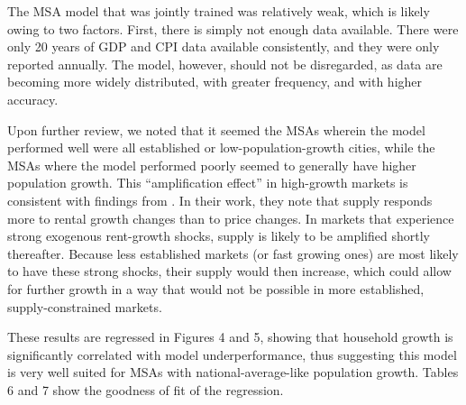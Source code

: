 \documentclass[jrfm,article,accept,oneauthor,pdftex]{Definitions/mdpi}
\begin{document}
The MSA model that was jointly trained was relatively weak, which is likely owing to two factors. First, there is simply not enough data available. There were only 20 years of GDP and CPI data available consistently, and they were only reported annually. The model, however, should not be disregarded, as data are becoming more widely distributed, with greater frequency, and with higher accuracy.

Upon further review, we noted that it seemed the MSAs wherein the model performed well were all established or low-population-growth cities, while the MSAs where the model performed poorly seemed to generally have higher population growth. This ``amplification effect'' in high-growth markets is consistent with findings from \cite{BUCHLER2021103370}. In their work, they note that supply responds more to rental growth changes than to price changes. In markets that experience strong exogenous rent-growth shocks, supply is likely to be amplified shortly thereafter. Because less established markets (or fast growing ones) are most likely to have these strong shocks, their supply would then increase, which could allow for further growth in a way that would not be possible in more established, supply-constrained markets.

These results are regressed in Figures 4 and 5, showing that household growth is significantly correlated with model underperformance, thus suggesting this model is very well suited for MSAs with national-average-like population growth. Tables 6 and 7 show the goodness of fit of the regression. 
\end{document}
